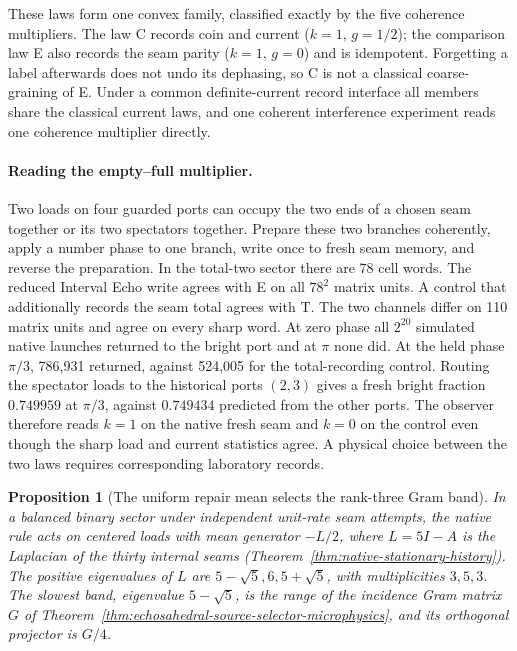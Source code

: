 \documentclass[11pt]{article}
\newtheorem{proposition}[theorem]{Proposition}
\theoremstyle{remark}
\theoremstyle{plain}
\begin{document}
These laws form one convex family, classified exactly by the five coherence
multipliers. The
law C records coin and current (\(k=1\), \(g=1/2\)); the comparison
law E also records the seam parity (\(k=1\), \(g=0\)) and is idempotent.
Forgetting a label afterwards does not undo its dephasing, so C is not a
classical coarse-graining of E. Under a common definite-current record
interface all members share the classical current laws, and one coherent
interference experiment reads one coherence multiplier directly.

\paragraph{Reading the empty--full multiplier.}
Two loads on four guarded ports can occupy the two ends of a chosen
seam together or its two spectators together. Prepare these two
branches coherently, apply a number phase to one branch, write once
to fresh seam memory, and reverse the preparation. In the total-two
sector there are 78 cell words. The reduced Interval Echo write agrees
with E on all $78^2$ matrix units. A control that additionally records
the seam total agrees with T. The two channels differ on 110 matrix
units and agree on every sharp word. At zero phase all $2^{20}$
simulated native launches returned to the bright port and at $\pi$
none did. At the held phase $\pi/3$, 786,931 returned, against
524,005 for the total-recording control. Routing the spectator
loads to the historical ports $(2,3)$ gives a fresh bright fraction
$0.749959$ at $\pi/3$, against $0.749434$ predicted from the other
ports. The observer therefore
reads $k=1$ on the native fresh seam and $k=0$ on the control
even though the sharp load and current statistics agree.
A physical choice between the two laws requires corresponding
laboratory records.

\begin{proposition}[The uniform repair mean selects the rank-three Gram band]
\label{prop:native-rank-three-band}
In a balanced binary sector under independent unit-rate seam attempts, the
native rule acts on centered loads with mean generator \(-L/2\), where \(L=5I-A\) is the
Laplacian of the thirty internal seams
(Theorem~\ref{thm:native-stationary-history}). The positive eigenvalues of
\(L\) are \(5-\sqrt5,6,5+\sqrt5\), with multiplicities \(3,5,3\). The slowest
band, eigenvalue \(5-\sqrt5\), is the range of the incidence Gram matrix
\(G\) of Theorem~\ref{thm:echosahedral-source-selector-microphysics}, and its
orthogonal projector is \(G/4\).
\end{proposition}
\end{document}
